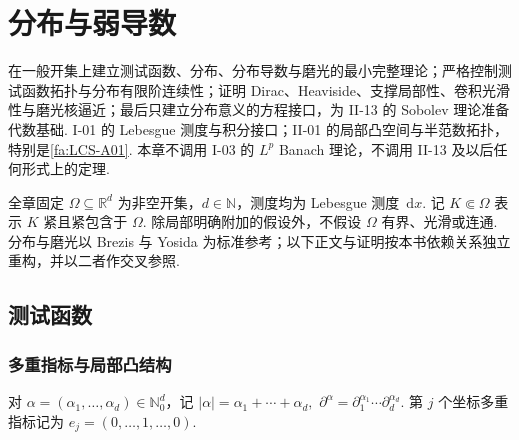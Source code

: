 \chapter{分布与弱导数}\label{chap:II-12}
\FAChapterOpening
{在一般开集上建立测试函数、分布、分布导数与磨光的最小完整理论；严格控制测试函数拓扑与分布有限阶连续性；证明 Dirac、Heaviside、支撑局部性、卷积光滑性与磨光核逼近；最后只建立分布意义的方程接口，为 II-13 的 Sobolev 理论准备代数基础.}
{I-01 的 Lebesgue 测度与积分接口；II-01 的局部凸空间与半范数拓扑，特别是\autoref{fa:LCS-A01}. 本章不调用 I-03 的 \(\displaystyle L^p\) Banach 理论，不调用 II-13 及以后任何形式上的定理.}
{\begin{center}
\end{center}}

全章固定 \(\displaystyle \Omega\subseteq\mathbb R^d\) 为非空开集，\(\displaystyle d\in\mathbb N\)，测度均为 Lebesgue 测度 \(\displaystyle\,\mathrm{d}x\). 记 \(\displaystyle K\Subset\Omega\) 表示 \(\displaystyle K\) 紧且紧包含于 \(\displaystyle\Omega\). 除局部明确附加的假设外，不假设 \(\displaystyle\Omega\) 有界、光滑或连通. 分布与磨光以 Brezis 与 Yosida 为标准参考；以下正文与证明按本书依赖关系独立重构，并以二者作交叉参照\cite{brezis2011,yosida}.

\section{测试函数}\label{sec:ii12-test-functions}

\subsection{多重指标与局部凸结构}

对 \(\displaystyle \alpha=(\alpha_1,\dots,\alpha_d)\in\mathbb N_0^d\)，记 \(\displaystyle |\alpha|=\alpha_1+\cdots+\alpha_d,\) \(\displaystyle \partial^\alpha=\partial_1^{\alpha_1}\cdots\partial_d^{\alpha_d}.\)
第 \(\displaystyle j\) 个坐标多重指标记为 \(\displaystyle e_j=(0,\dots,1,\dots,0)\).

